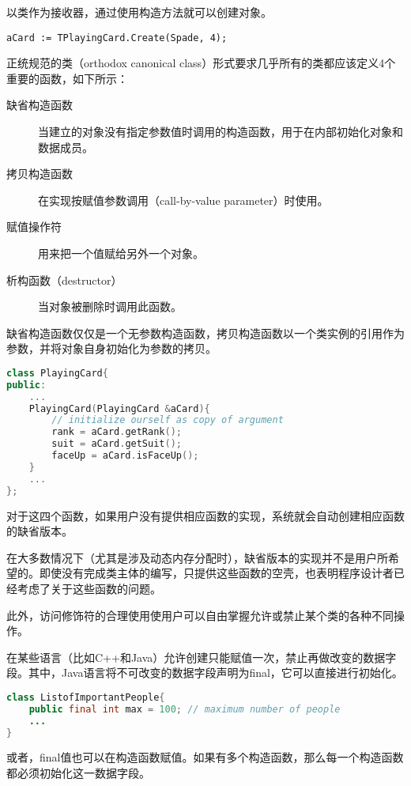 以类作为接收器，通过使用构造方法就可以创建对象。

\begin{lstlisting}[language=Delphi]
aCard := TPlayingCard.Create(Spade, 4);
\end{lstlisting}


正统规范的类（orthodox canonical class）形式要求几乎所有的类都应该定义4个重要的函数，如下所示：

\begin{description}
\item[缺省构造函数] 当建立的对象没有指定参数值时调用的构造函数，用于在内部初始化对象和数据成员。
\item[拷贝构造函数] 在实现按赋值参数调用（call-by-value parameter）时使用。
\item[赋值操作符] 用来把一个值赋给另外一个对象。
\item[析构函数（destructor）] 当对象被删除时调用此函数。
\end{description}

缺省构造函数仅仅是一个无参数构造函数，拷贝构造函数以一个类实例的引用作为参数，并将对象自身初始化为参数的拷贝。



\begin{lstlisting}[language=C++]
class PlayingCard{
public:
	...
	PlayingCard(PlayingCard &aCard){
		// initialize ourself as copy of argument
		rank = aCard.getRank();
		suit = aCard.getSuit();
		faceUp = aCard.isFaceUp();
	}
	...
};
\end{lstlisting}


对于这四个函数，如果用户没有提供相应函数的实现，系统就会自动创建相应函数的缺省版本。

在大多数情况下（尤其是涉及动态内存分配时），缺省版本的实现并不是用户所希望的。即使没有完成类主体的编写，只提供这些函数的空壳，也表明程序设计者已经考虑了关于这些函数的问题。

此外，访问修饰符的合理使用使用户可以自由掌握允许或禁止某个类的各种不同操作。

在某些语言（比如C++和Java）允许创建只能赋值一次，禁止再做改变的数据字段。其中，Java语言将不可改变的数据字段声明为final，它可以直接进行初始化。




\begin{lstlisting}[language=Java]
class ListofImportantPeople{
	public final int max = 100; // maximum number of people
	...
}
\end{lstlisting}

或者，final值也可以在构造函数赋值。如果有多个构造函数，那么每一个构造函数都必须初始化这一数据字段。



